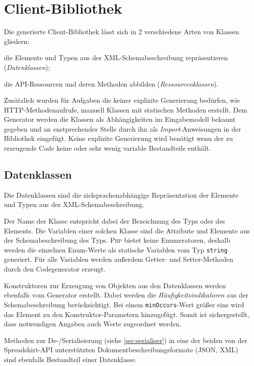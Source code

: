 \section{Client-Bibliothek}
\label{sec:client_library}

Die generierte Client-Bibliothek lässt sich in 2 verschiedene Arten von Klassen gliedern:
\begin{compactenum}
    \item die Elemente und Typen aus der \gls{XML}-Schemabeschreibung repräsentieren (\emph{Datenklassen});
    \item die \gls{API}-Ressourcen und deren Methoden abbilden (\emph{Ressourcenklassen}).
\end{compactenum}

Zusätzlich wurden für Aufgaben die keiner explizite Generierung bedürfen, wie \gls{HTTP}-Methodenaufrufe, manuell Klassen mit statischen Methoden erstellt. Dem Generator werden die Klassen als Abhängigkeiten im Eingabemodell bekannt gegeben und an enstprechender Stelle durch ihn als \emph{Import}-Anweisungen in der Bibliothek eingefügt. Keine explizite Generierung wird benötigt wenn der zu erzeugende Code keine oder sehr wenig variable Bestandteile enthält.

\subsection{Datenklassen}
\label{sec:dataclasses}

Die Datenklassen sind die zielsprachenabhängige Repräsentation der Elemente und Typen aus der \gls{XML}-Schemabeschreibung. 

Der Name der Klasse entspricht dabei der Bezeichnung des Typs oder des Elements. Die Variablen einer solchen Klasse sind die Attribute und Elemente aus der Schemabeschreibung des Typs. \textsc{Php} bietet keine Enumeratoren, deshalb werden die einzelnen Enum-Werte als statische Variablen vom Typ \texttt{string} generiert. Für alle Variablen werden außerdem Getter- und Setter-Methoden durch den Codegenerator erzeugt.

Konstruktoren zur Erzeugung von Objekten aus den Datenklassen werden ebenfalls vom Generator erstellt. Dabei werden die \emph{Häufigkeitsindikatoren} aus der Schemabeschreibung berücksichtigt. Bei einem \texttt{minOccurs}-Wert größer eins wird das Element zu den Konstruktor-Parametern hinzugefügt. Somit ist sichergestellt, dass notwendigen Angaben auch Werte zugeordnet werden.

Methoden zur De-/Serialisierung (siehe \cref{sec:serialiser}) in eine der beiden von der Spreadshirt-\gls{API} unterstützten Dokumentbeschreibungsformate (\gls{JSON}, \gls{XML}) sind ebenfalls Bestandteil einer Datenklasse.

